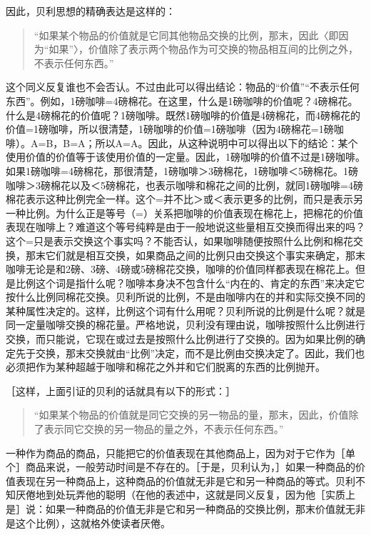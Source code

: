 因此，贝利思想的精确表达是这样的：

\begin{quote}{“如果某个物品的价值就是它同其他物品交换的比例，那末，因此〈即因为“如果”〉，价值除了表示两个物品作为可交换的物品相互间的比例之外，不表示任何东西。”}\end{quote}

这个同义反复谁也不会否认。不过由此可以得出结论：物品的“价值”“不表示任何东西”。例如，1磅咖啡=4磅棉花。在这里，什么是1磅咖啡的价值呢？4磅棉花。什么是4磅棉花的价值呢？1磅咖啡。既然1磅咖啡的价值是4磅棉花，而4磅棉花的价值=1磅咖啡，所以很清楚，1磅咖啡的价值=1磅咖啡（因为4磅棉花=1磅咖啡）。A=B，B=A；所以A=A。因此，从这种说明中可以得出以下的结论：某个使用价值的价值等于该使用价值的一定量。因此，1磅咖啡的价值不过是1磅咖啡。如果1磅咖啡=4磅棉花，那很清楚，1磅咖啡＞3磅棉花，1磅咖啡＜5磅棉花。1磅咖啡＞3磅棉花以及＜5磅棉花，也表示咖啡和棉花之间的比例，就同1磅咖啡=4磅棉花表示这种比例完全一样。这个=并不比＞或＜表示更多的比例，而只是表示另一种比例。为什么正是等号（=）关系把咖啡的价值表现在棉花上，把棉花的价值表现在咖啡上？难道这个等号纯粹是由于一般地说这些量相互交换而得出来的吗？这个=只是表示交换这个事实吗？不能否认，如果咖啡随便按照什么比例和棉花交换，那末它们就是相互交换，如果商品之间的比例只由交换这个事实来确定，那末咖啡无论是和2磅、3磅、4磅或5磅棉花交换，咖啡的价值同样都表现在棉花上。但是比例这个词是指什么呢？咖啡本身决不包含什么“内在的、肯定的东西”来决定它按什么比例同棉花交换。贝利所说的比例，不是由咖啡内在的并和实际交换不同的某种属性决定的。这样，比例这个词有什么用呢？贝利所说的比例是什么呢？就是同一定量咖啡交换的棉花量。严格地说，贝利没有理由说，咖啡按照什么比例进行交换，而只能说，它现在或过去是按照什么比例进行了交换的。因为如果比例的确定先于交换，那末交换就由“比例”决定，而不是比例由交换决定了。因此，我们也必须把作为某种超越于咖啡和棉花之外并和它们脱离的东西的比例抛开。

［这样，上面引证的贝利的话就具有以下的形式：］

\begin{quote}{“如果某个物品的价值就是同它交换的另一物品的量，那末，因此，价值除了表示同它交换的另一物品的量之外，不表示任何东西。”}\end{quote}

一种作为商品的商品，只能把它的价值表现在其他商品上，因为对于它作为［单个］商品来说，一般劳动时间是不存在的。［于是，贝利认为，］如果一种商品的价值表现在另一种商品上，这种商品的价值就无非是它和另一种商品的等式。贝利不知厌倦地到处玩弄他的聪明（在他的表述中，这就是同义反复，因为他［实质上是］说：如果一种商品的价值无非是它和另一种商品的交换比例，那末价值就无非是这个比例），这就格外使读者厌倦。

